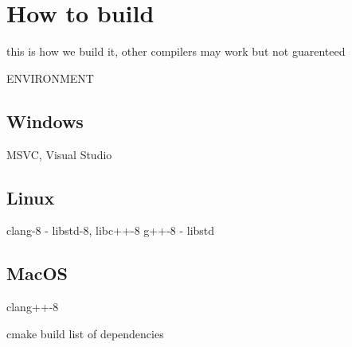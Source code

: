 \chapter{How to build}
\label{build}
this is how we build it, other compilers may work but not guarenteed

ENVIRONMENT
\section{Windows}
MSVC, Visual Studio
\section{Linux}
clang-8 - libstd-8, libc++-8
g++-8 - libstd

\section{MacOS}
clang++-8

cmake build
list of dependencies